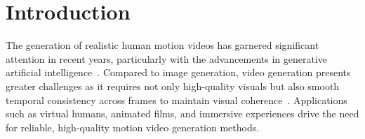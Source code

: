 \section{Introduction}
\label{sec:intro}

The generation of realistic human motion videos has garnered significant attention in recent years, particularly with the advancements in generative artificial intelligence~\cite{hu2024animate,guo2023animatediff,chang2023magicdance,zhu2024champ,zhang2024mimicmotion,xu2024magicanimate,xue2024follow,lin2024cyberhost}. Compared to image generation, video generation presents greater challenges as it requires not only high-quality visuals but also smooth temporal consistency across frames to maintain visual coherence~\cite{zhang2024mimicmotion}. Applications such as virtual humans, animated films, and immersive experiences drive the need for reliable, high-quality motion video generation methods.



